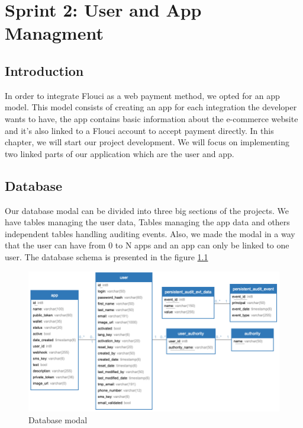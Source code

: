 
\setcounter{chapter}{3}
\chapter{Sprint 2: User and App Managment}
\minitoc %
\graphicspath{{Chapter4/figures/}}

\pagestyle{fancy}
\fancyhf{}
\fancyhead[R]{\bfseries\rightmark}
\fancyfoot[R]{\thepage}
\renewcommand{\headrulewidth}{0.5pt}
\renewcommand{\footrulewidth}{0pt}
\renewcommand{\chaptermark}[1]{\markboth{\MakeUppercase{\chaptername~\thechapter. #1 }}{}}
\renewcommand{\sectionmark}[1]{\markright{\thechapter.\thesection~ #1}}

\begin{spacing}{1.2}

\section*{Introduction}
In order to integrate Flouci as a web payment method, we opted for an app model. This model consists of creating an app for each integration the developer wants to have, the app contains basic information about the e-commerce website and it's also linked to a Flouci account to accept payment directly.
\newline
In this chapter, we will start our project development. We will focus on implementing two linked parts of our application which are the user and app. 

\section{Database}
Our database modal can be divided into three big sections of the projects. We have tables managing the user data, Tables managing the app data and others independent tables handling auditing events. Also, we made the modal in a way that the user can have from 0 to N apps and an app can only be linked to one user.
The database schema is presented in the figure \ref{fig:database}
\begin{figure}[H]\centering
\includegraphics[scale=0.6]{db.png}
\caption{Database modal}
\label{fig:database}
\end{figure}



\end{spacing}
